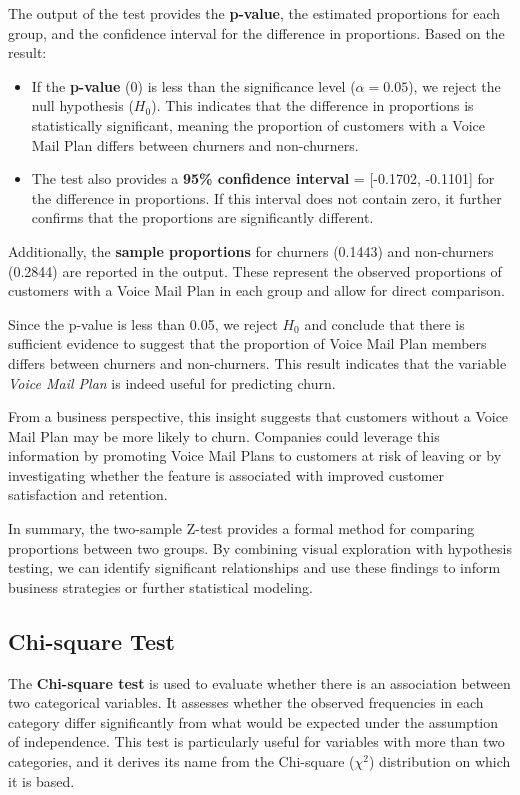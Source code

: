 \documentclass[
]{book}
\theoremstyle{definition}
\theoremstyle{definition}
\theoremstyle{definition}
\theoremstyle{definition}
\theoremstyle{remark}
\begin{document}
The output of the test provides the \textbf{p-value}, the estimated proportions for each group, and the confidence interval for the difference in proportions. Based on the result:

\begin{itemize}
\item
  If the \textbf{p-value} (0) is less than the significance level (\(\alpha = 0.05\)), we reject the null hypothesis (\(H_0\)). This indicates that the difference in proportions is statistically significant, meaning the proportion of customers with a Voice Mail Plan differs between churners and non-churners.
\item
  The test also provides a \textbf{95\% confidence interval} = {[}-0.1702, -0.1101{]} for the difference in proportions. If this interval does not contain zero, it further confirms that the proportions are significantly different.
\end{itemize}

Additionally, the \textbf{sample proportions} for churners (0.1443) and non-churners (0.2844) are reported in the output. These represent the observed proportions of customers with a Voice Mail Plan in each group and allow for direct comparison.

Since the p-value is less than 0.05, we reject \(H_0\) and conclude that there is sufficient evidence to suggest that the proportion of Voice Mail Plan members differs between churners and non-churners. This result indicates that the variable \emph{Voice Mail Plan} is indeed useful for predicting churn.

From a business perspective, this insight suggests that customers without a Voice Mail Plan may be more likely to churn. Companies could leverage this information by promoting Voice Mail Plans to customers at risk of leaving or by investigating whether the feature is associated with improved customer satisfaction and retention.

In summary, the two-sample Z-test provides a formal method for comparing proportions between two groups. By combining visual exploration with hypothesis testing, we can identify significant relationships and use these findings to inform business strategies or further statistical modeling.

\subsection{Chi-square Test}\label{chi-square-test}

The \textbf{Chi-square test} is used to evaluate whether there is an association between two categorical variables. It assesses whether the observed frequencies in each category differ significantly from what would be expected under the assumption of independence. This test is particularly useful for variables with more than two categories, and it derives its name from the Chi-square (\(\chi^2\)) distribution on which it is based.
\end{document}
